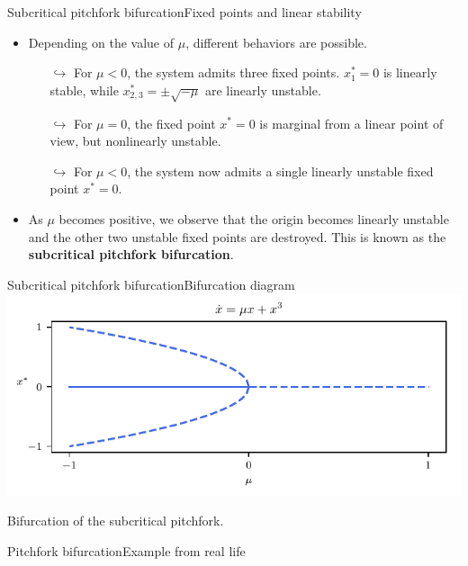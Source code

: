 \documentclass[usenames,dvipsnames,svgnames,10pt,aspectratio=169]{beamer}
\begin{document}
\begin{frame}[t, c]{Subcritical pitchfork bifurcation}{Fixed points and linear stability}
	\begin{itemize}
		\item Depending on the value of $\mu$, different behaviors are possible.
		\begin{itemize}
			\item[$\hookrightarrow$] For $\mu < 0$, the system admits three fixed points. $x_1^*=0$ is linearly stable, while $x^*_{2, 3} = \pm \sqrt{-\mu}$ are linearly unstable.
			\item[$\hookrightarrow$] For $\mu = 0$, the fixed point $x^*=0$ is marginal from a linear point of view, but nonlinearly unstable.
			\item[$\hookrightarrow$] For $\mu<0$, the system now admits a single linearly unstable fixed point $x^* = 0$.
		\end{itemize}

		\medskip

		\item As $\mu$ becomes positive, we observe that the origin becomes linearly unstable and the other two unstable fixed points are destroyed. This is known as the \alert{\textbf{subcritical pitchfork bifurcation}}.
	\end{itemize}

	\vspace{1cm}
\end{frame}

\begin{frame}[t, c]{Subcritical pitchfork bifurcation}{Bifurcation diagram}
	\centering
	\includegraphics[width=.75\textwidth]{subcritical_pitchfork_bifurcation_diagram}

	Bifurcation of the subcritical pitchfork.

	\vspace{1cm}

\end{frame}

\begin{frame}[t, c]{Pitchfork bifurcation}{Example from real life}

\end{frame}
\end{document}
